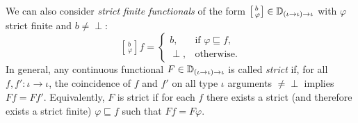 \documentclass[fleqn]{LMCS}
\theoremstyle{plain}\newtheorem{satz}[thm]{Satz}
\theoremstyle{plain}\newtheorem{hyp}[thm]{Hypothesis}
\theoremstyle{plain}\newtheorem{hyps}[thm]{Hypotheses}
\theoremstyle{definition}\newtheorem{note}[thm]{Note}
\newcommand{\arr}{\rightarrow}
\newcommand{\Undef}{{\perp}}
\newcommand{\?}{\mbox{?}}
\begin{document}
We can also consider \emph{strict finite functionals} of the form 
$\left[\,_{\varphi}^{b}\right]\in \bbD_{(\iota\arr\iota)\arr\iota}$ 
with $\varphi$ strict finite and $b\ne\Undef$:
\[
\left[\,_{\varphi}^{b}\right]f=\left\{
				\begin{array}{cl}
				b, & \mbox{if }\varphi\sqsubseteq f, \\
				\Undef, & \mbox{otherwise}.
				\end{array}
				\right.
\] 
In general, any continuous functional $F\in \bbD_{(\iota\arr\iota)\arr\iota}$ is 
called \emph{strict} if, 
for all $f,f':\mbox{$\iota\arr\iota$}$, the coincidence of $f$ and $f'$ 
on all type $\iota$ 
arguments ${}\ne\Undef$ implies $Ff=Ff'$. 
Equivalently, $F$ is strict if for each $f$ 
there exists a strict (and therefore exists a strict finite) 
$\varphi\sqsubseteq f$ such that $Ff=F\varphi$. 
\end{document}
